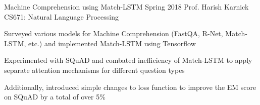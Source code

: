 \begin{cventries}
	\cventry
	{Machine Comprehension using Match-LSTM}
	{}
	{Spring 2018}
	{Prof. Harish Karnick}
	{CS671: Natural Language Processing}
	{
		\begin{cvitems}
		\item Surveyed various models for Machine Comprehension (FastQA, R-Net, Match-LSTM, etc.) and implemented Match-LSTM using Tensorflow
		\item Experimented with SQuAD and combated inefficiency of Match-LSTM to apply separate attention mechanisms for different question types
		\item Additionally, introduced simple changes to loss function to improve the EM score on SQuAD by a total of over 5\%
		\end{cvitems}
	}

\end{cventries}

